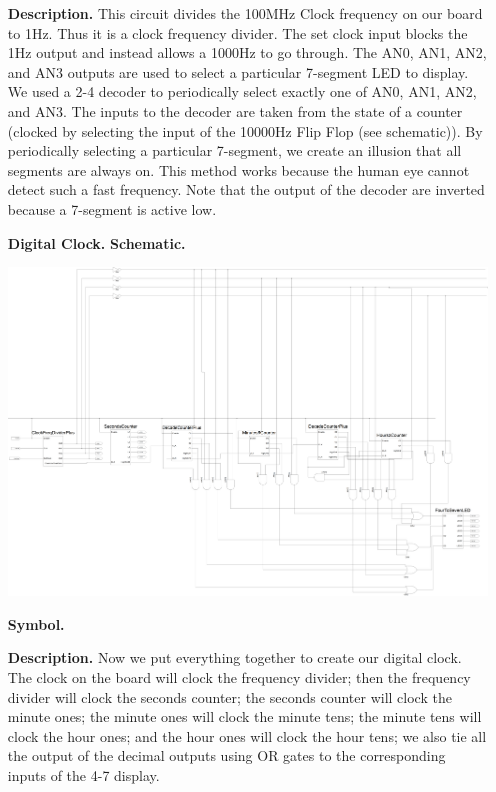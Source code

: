 \documentclass[9pt]{article}
\begin{document}
\begin{enumerate}
             \textbf{Description.} This circuit divides the 100MHz Clock
             frequency on our board to 1Hz. Thus it is a clock frequency
             divider. The set clock input blocks the 1Hz output and instead
             allows a 1000Hz to go through. The AN0, AN1, AN2, and AN3 outputs
             are used to select a particular 7-segment LED to display. We used
             a 2-4 decoder to periodically select exactly one of AN0, AN1, AN2,
             and AN3. The inputs to the decoder are taken from the state of a
             counter (clocked by selecting the input of the 10000Hz Flip Flop
             (see schematic)). By periodically selecting a particular 7-segment,
             we create an illusion that all segments are always on. This method
             works because the human eye cannot detect such a fast frequency.
             Note that the output of the decoder are inverted because a 7-segment
             is active low.
             
  	\item[\textbf{Digital Clock.}] \textbf{Schematic.}
   
             \begin{center}
                \includegraphics[width=\textwidth]{Driver.png}
             \end{center}
             
             \newpage
             \textbf{Symbol.}
             
             \textbf{Description.} Now we put everything together to create our
             digital clock. The clock on the board will clock the frequency
             divider; then the frequency divider will clock the seconds counter;
             the seconds counter will clock the minute ones; the minute ones
             will clock the minute tens; the minute tens will clock the hour
             ones; and the hour ones will clock the hour tens; we also tie all
             the output of the decimal outputs using OR gates to the corresponding
             inputs of the 4-7 display. 
   
   
   
\end{enumerate}
\end{document}
